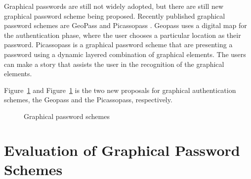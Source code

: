   Graphical passwords are still not widely adopted, but there are still new graphical password scheme being proposed. Recently published graphical password schemes are GeoPass \cite{GeoPass} and Picassopass \cite{PicassoPass}. Geopass uses a digital map for the authentication phase, where the user chooses a particular location as their password. Picassopass is a graphical password scheme that are presenting a password using a dynamic layered combination of graphical elements. The users can make a story that assists the user in the recognition of the graphical elements.

  Figure~\ref{} and Figure~\ref{} is the two new proposals for graphical authentication schemes, the Geopass and the Picassopass, respectively. 

  \begin{figure}[H]
    \centering
    \ContinuedFloat
    \caption{Graphical password schemes}
  \end{figure}

 \section{Evaluation of Graphical Password Schemes}

